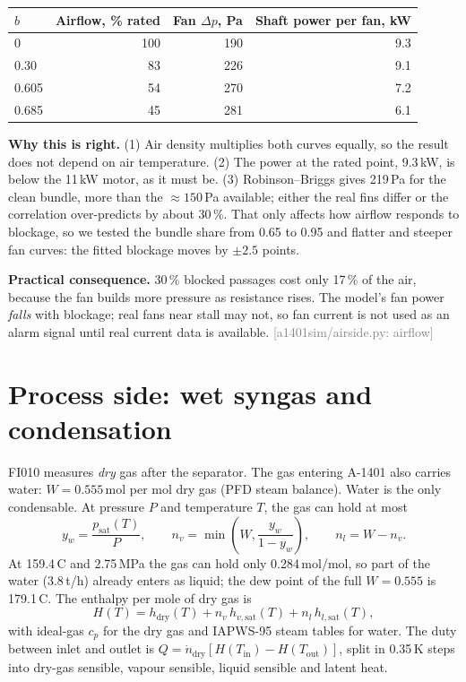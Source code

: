\documentclass[11pt,a4paper]{article}
\newcommand{\src}[1]{\textcolor{gray}{\small[#1]}}
\newcommand{\why}[1]{\par\noindent\textbf{Why this is right.} #1\par}
\begin{document}
\begin{center}\small\setlength{\tabcolsep}{4pt}\begin{tabular}{lrrr}
\toprule
$b$ & Airflow, \% rated & Fan $\Delta p$, Pa & Shaft power per fan, kW\\\midrule
0 & 100 & 190 & 9.3\\
0.30 & 83 & 226 & 9.1\\
0.605 & 54 & 270 & 7.2\\
0.685 & 45 & 281 & 6.1\\
\bottomrule\end{tabular}\end{center}
\why{(1) Air density multiplies both curves equally, so the result does not depend on air temperature. (2) The power at the rated point, 9.3\,kW, is below the 11\,kW motor, as it must be. (3) Robinson--Briggs gives 219\,Pa for the clean bundle, more than the $\approx150$\,Pa available; either the real fins differ or the correlation over-predicts by about 30\,\%. That only affects how airflow responds to blockage, so we tested the bundle share from 0.65 to 0.95 and flatter and steeper fan curves: the fitted blockage moves by $\pm2.5$ points.}
\noindent\textbf{Practical consequence.} 30\,\% blocked passages cost only 17\,\% of the air, because the fan builds more pressure as resistance rises. The model's fan power \emph{falls} with blockage; real fans near stall may not, so fan current is not used as an alarm signal until real current data is available.
\src{a1401sim/airside.py: airflow}

\section{Process side: wet syngas and condensation}

FI010 measures \emph{dry} gas after the separator. The gas entering A-1401 also carries water: $W=0.555$\,mol per mol dry gas (PFD steam balance). Water is the only condensable. At pressure $P$ and temperature $T$, the gas can hold at most
\[
y_w = \frac{p_\text{sat}(T)}{P}, \qquad n_v = \min\!\left(W, \frac{y_w}{1-y_w}\right),\qquad n_l = W - n_v .
\]
At 159.4\,\textdegree C and 2.75\,MPa the gas can hold only 0.284\,mol/mol, so part of the water (3.8\,t/h) already enters as liquid; the dew point of the full $W=0.555$ is 179.1\,\textdegree C. The enthalpy per mole of dry gas is
\[
H(T) = h_\text{dry}(T) + n_v\,h_{v,\text{sat}}(T) + n_l\,h_{l,\text{sat}}(T),
\]
with ideal-gas $c_p$ for the dry gas and IAPWS-95 steam tables for water. The duty between inlet and outlet is $Q=\dot n_\text{dry}[H(T_\text{in})-H(T_\text{out})]$, split in 0.35\,K steps into dry-gas sensible, vapour sensible, liquid sensible and latent heat.
\end{document}
